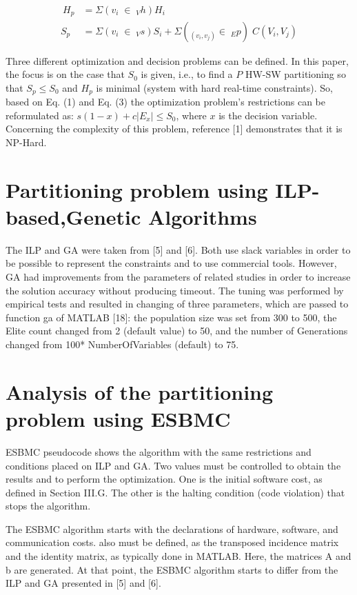 \begin{align}
\ H_p &= \Sigma (v_i \;\in\; _Vh) H_i\\
  S_p &= \Sigma (v_i \;\in\; _Vs) S_i + \Sigma (_(v_i,v_j) \in\; _Ep)\; C(V_i, V_j)
\end{align}

Three different optimization and decision problems can be defined. In this paper, the focus is on the case that $ S_0 $ is given, i.e., to find a $ P $ HW-SW partitioning so that $ S_p \leq S_0 $ and $ H_p $ is minimal (system with hard real-time constraints). So, based on Eq. (1) and Eq. (3) the optimization problem’s restrictions can be reformulated as: $ s(1-x) + c|E_x| \leq S_0 $, where $ x $ is the decision variable. Concerning the complexity of this problem, reference [1] demonstrates that it is NP-Hard.

\section{Partitioning problem using ILP-based,Genetic Algorithms}
\label{ILPGA}
The ILP and GA were taken from [5] and [6]. Both use slack variables in order to be possible to represent the constraints and to use commercial tools. However, GA had improvements from the parameters of related studies in order to increase the solution accuracy without producing timeout. The tuning was performed by empirical tests and resulted in changing of three parameters, which are passed to function ga of MATLAB [18]: the population size was set from 300 to 500, the Elite count changed from 2 (default value) to 50, and the number of Generations changed from 100* NumberOfVariables (default) to 75.

\section{Analysis of the partitioning problem using ESBMC}
ESBMC pseudocode shows the algorithm with the same restrictions and conditions placed on ILP and GA. Two values must be controlled to obtain the results and to perform the optimization. One is the initial software cost, as defined in Section III.G. The other is the halting condition (code violation) that stops the algorithm.

The ESBMC algorithm starts with the declarations of hardware, software, and communication costs.  also must be defined, as the transposed incidence matrix and the identity matrix, as typically done in MATLAB. Here, the matrices A and b are generated. At that point, the ESBMC algorithm starts to differ from the ILP and GA presented in [5] and [6].

